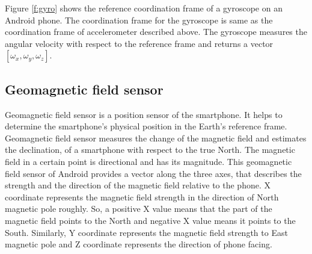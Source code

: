 Figure \ref{f:gyro} shows the reference coordination frame of a gyroscope on an Android phone.
The coordination frame for the gyroscope is same as the coordination frame of accelerometer described above.
The gyroscope measures the angular velocity with respect to the reference frame and returns a vector $[\omega_x, \omega_y, \omega_z]$.


\subsection{Geomagnetic field sensor}
Geomagnetic field sensor is a position sensor of the smartphone.
It helps to determine the smartphone's physical position in the Earth's reference frame.
Geomagnetic field sensor measures the change of the magnetic field and estimates the declination, of a smartphone with respect to the true North. 
The magnetic field in a certain point is directional and has its magnitude.
This geomagnetic field sensor of Android provides a vector along the three axes, that describes the strength and the direction of the magnetic field relative to the phone.
X coordinate represents the magnetic field strength in the direction of North magnetic pole roughly.
So, a positive X value means that the part of the magnetic field points to the North and negative X value means it points to the South.
Similarly, Y coordinate represents the magnetic field strength to East magnetic pole and Z coordinate represents the direction of phone facing.
 

